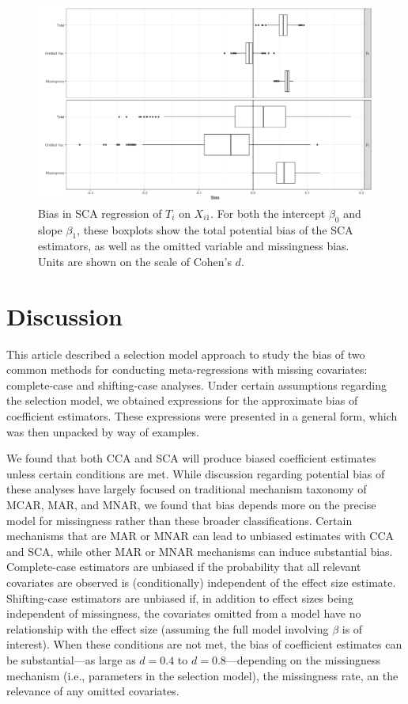 \documentclass[
]{article}
\begin{document}
\begin{figure}
\begin{center}
\includegraphics[width = .8\textwidth]{../../writeup/cca_paper/graphics/bias_boxplot.jpg}
\end{center}
\caption{Bias in SCA regression of $T_i$ on $X_{i1}$. For both the intercept $\beta_0$ and slope $\beta_1$, these boxplots show the total potential bias of the SCA estimators, as well as the omitted variable and missingness bias. Units are shown on the scale of Cohen's $d$.}
\label{fig:bias-box}
\end{figure}

\hypertarget{discussion}{%
\section{Discussion}\label{discussion}}

This article described a selection model approach to study the bias of two common methods for conducting meta-regressions with missing covariates: complete-case and shifting-case analyses.
Under certain assumptions regarding the selection model, we obtained expressions for the approximate bias of coefficient estimators.
These expressions were presented in a general form, which was then unpacked by way of examples.

We found that both CCA and SCA will produce biased coefficient estimates unless certain conditions are met.
While discussion regarding potential bias of these analyses have largely focused on traditional mechanism taxonomy of MCAR, MAR, and MNAR, we found that bias depends more on the precise model for missingness rather than these broader classifications.
Certain mechanisms that are MAR or MNAR can lead to unbiased estimates with CCA and SCA, while other MAR or MNAR mechanisms can induce substantial bias.
Complete-case estimators are unbiased if the probability that all relevant covariates are observed is (conditionally) independent of the effect size estimate.
Shifting-case estimators are unbiased if, in addition to effect sizes being independent of missingness, the covariates omitted from a model have no relationship with the effect size (assuming the full model involving \(\beta\) is of interest).
When these conditions are not met, the bias of coefficient estimates can be substantial---as large as \(d = 0.4\) to \(d = 0.8\)---depending on the missingness mechanism (i.e., parameters in the selection model), the missingness rate, an the relevance of any omitted covariates.
\end{document}
